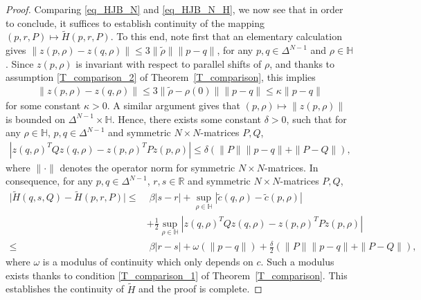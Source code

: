 \documentclass{article}
\theoremstyle{definition}
\numberwithin{equation}{section}
\numberwithin{theorem}{section}
\newcommand{\R}{\mathbb{R}}
\newcommand{\Hb}{\mathbb{H}}
\begin{document}
\begin{proof}
Comparing \eqref{eq_HJB_N} and \eqref{eq_HJB_N_H}, we now see that in order to conclude, it suffices to establish continuity of the mapping $(p,r,P)\mapsto\tilde H(p,r,P)$. 
To this end, note first that an elementary calculation gives $\|z(p,\rho)-z(q,\rho)\|
\le 3\|\tilde\rho\|\|p-q\|$, for any $p,q\in\Delta^{N-1}$ and $\rho\in\Hb$.
Since $z(p,\rho)$ is invariant with respect to parallel shifts of $\rho$, and thanks to assumption \ref{T_comparison_2} of Theorem~\ref{T_comparison}, this implies
\begin{align}\label{eq:revision_bound_norm_z}
\|z(p,\rho)-z(q,\rho)\| \le 3\|\tilde\rho - \rho(0) \|\|p-q\| \le \kappa\|p-q\|
\end{align}
for some constant $\kappa>0$. 
A similar argument gives that $(p,\rho)\mapsto\|z(p,\rho)\|$ is bounded on $\Delta^{N-1}\times\Hb$. 
Hence, there exists some constant $\delta>0$, such that for any $\rho\in\Hb$, $p,q\in\Delta^{N-1}$ and symmetric $N\times N$-matrices $P,Q$,
\begin{align*}
     \left|z(q,\rho)^TQz(q,\rho)-z(p,\rho)^TPz(p,\rho)\right|
     \le\delta\left(\|P\|\|p-q\|+\|P-Q\|\right),
\end{align*}
where $\|\cdot\|$ denotes the operator norm for symmetric $N\times N$-matrices.
In consequence, for any $p,q\in\Delta^{N-1}$, $r,s\in\R$ and symmetric $N\times N$-matrices $P,Q$,
\begin{align}\label{eq:revision_estimate_hamiltonian}
    \big|\tilde H(q,s,Q)-\tilde H(p,r,P)\big|
    \le & \;\beta \left|s-r\right|
    +\sup_{\rho\in\Hb}\left|\tilde c(q,\rho)-\tilde c(p,\rho)\right|\nonumber\\
    &+\frac12\sup_{\rho\in\Hb}\left|z(q,\rho)^TQz(q,\rho)-z(p,\rho)^TPz(p,\rho)\right|\\
    \le & \;\beta|r-s|+\omega(\|p-q\|)+\frac{\delta}{2}\left(\|P\|\|p-q\|+\|P-Q\|\right),\nonumber
\end{align}
where $\omega$ is a modulus of continuity which only depends on $c$. Such a modulus exists thanks to condition \ref{T_comparison_1} of Theorem~\ref{T_comparison}.
This establishes the continuity of $\tilde H$ and the proof is complete.
\end{proof}
\end{document}
